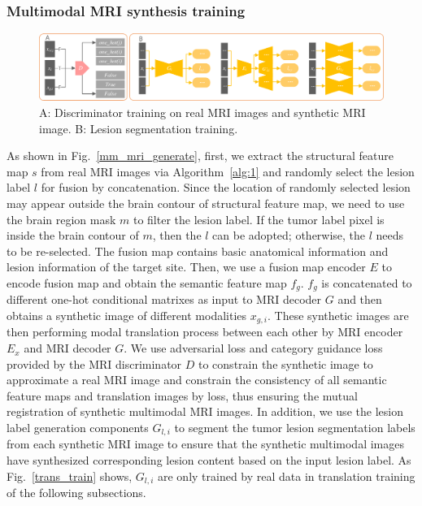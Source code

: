 \documentclass[runningheads]{llncs}
\begin{document}
\subsubsection{Multimodal MRI synthesis training}
\begin{figure}
	\centering
	\includegraphics[width=1\columnwidth]{figures/DandSEG}
	\caption{A: Discriminator training on real MRI images and synthetic MRI image. B: Lesion segmentation training.}
	\label{train_D}
	\label{segmentation}
\end{figure}
As shown in Fig.~\ref{mm_mri_generate}, first, we extract the structural feature map $s$ from real MRI images via Algorithm~\ref{alg:1} and randomly select the lesion label $l$ for fusion by concatenation. Since the location of randomly selected lesion may appear outside the brain contour of structural feature map, we need to use the brain region mask $m$ to filter the lesion label. If the tumor label pixel is inside the brain contour of $m$, then the $l$ can be adopted; otherwise, the $l$ needs to be re-selected. The fusion map contains basic anatomical information and lesion information of the target site. Then, we use a fusion map encoder $E$ to encode fusion map and obtain the semantic feature map $f_g$. $f_g$ is concatenated to different one-hot conditional matrixes as input to MRI decoder $G$ and then obtains a synthetic image of different modalities $x_{g,i}$. These synthetic images are then performing modal translation process between each other by MRI encoder $E_x$ and MRI decoder $G$. We use adversarial loss and category guidance loss provided by the MRI discriminator $D$ to constrain the synthetic image to approximate a real MRI image and constrain the consistency of all semantic feature maps and translation images by loss, thus ensuring the mutual registration of synthetic multimodal MRI images. 
In addition, we use the lesion label generation components $G_{l,i}$ to segment the tumor lesion segmentation labels from each synthetic MRI image to ensure that the synthetic multimodal images have synthesized corresponding lesion content based on the input lesion label. As Fig.~\ref{trans_train} shows, $G_{l,i}$ are only trained by real data in translation training of the following subsections. 
\end{document}
